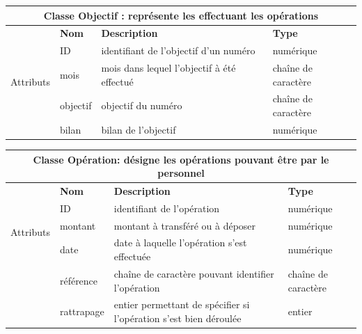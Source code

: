 		\begin{tabular}{|l|l|l|l|}
			\hline
			\multicolumn{4}{|c|}{\textbf{Classe Objectif : représente les effectuant les opérations}} \\
			
			\hline
			
			& \textbf{Nom} & \textbf{Description} & \textbf{Type} \\
			\multirow{3}{*}{Attributs} & ID & identifiant de l'objectif d'un numéro & numérique \\
			
			& mois & mois dans lequel l'objectif à été effectué &  chaîne de caractère \\
			
			& objectif & objectif du numéro &chaîne de caractère \\
			
			& bilan & bilan de l'objectif & numérique \\
			
			\hline
			
		\end{tabular}
		\label{table4}
		
		
		\begin{tabular}{|l|l|l|l|}
			\hline
			\multicolumn{4}{|c|}{\textbf{Classe Opération: désigne les opérations pouvant être par le personnel}} \\
			
			\hline
			
			& \textbf{Nom} & \textbf{Description} & \textbf{Type} \\
			\multirow{3}{*}{Attributs} & ID & identifiant de l'opération & numérique \\
			
			& montant & montant à transféré ou à déposer & numérique\\
			
			& date & date à laquelle l'opération s'est effectuée & numérique \\
			
			& référence & chaîne de caractère pouvant identifier l'opération & chaîne de caractère\\
			
			& rattrapage & entier permettant de spécifier si l'opération s'est bien déroulée & entier \\
			
			\hline
			
		\end{tabular}
		\label{table5}
		
